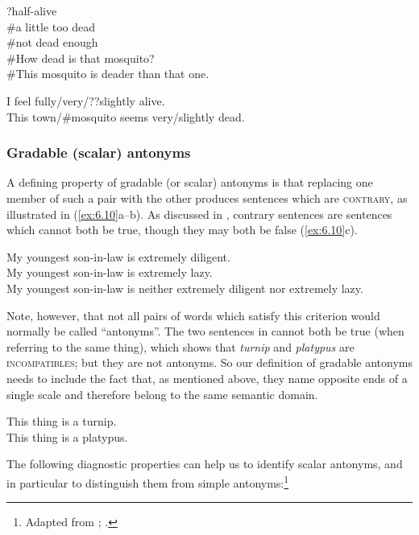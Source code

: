\ea \label{ex:6.8}
\ea ?half-alive\\
\ex \#a little too dead\\
\ex \#not dead enough\\
\ex \#How dead is that mosquito?\\
\ex \#This mosquito is deader than that one.
                       \z
\z

\ea \label{ex:6.9}
\ea I feel fully/very/??slightly alive.\\
\ex This town/\#mosquito seems very/slightly dead.
                       \z
\z

\subsubsection{Gradable (scalar) antonyms}\label{sec:6.2.2.2}

A defining property of gradable (or scalar) antonyms is that replacing one member of such a pair with the other produces sentences which are \textsc{contrary}, as illustrated in (\ref{ex:6.10}a--b). As discussed in , contrary sentences are sentences which cannot both be true, though they may both be false (\ref{ex:6.10}c).


\ea \label{ex:6.10}
\ea My youngest son-in-law is extremely diligent.\\
\ex My youngest son-in-law is extremely lazy.\\
\ex My youngest son-in-law is neither extremely diligent nor extremely lazy.
                       \z
\z


Note, however, that not all pairs of words which satisfy this criterion would normally be called “antonyms”. The two sentences in  cannot both be true (when referring to the same thing), which shows that \textit{turnip} and \textit{platypus} are \textsc{incompatibles}; but they are not antonyms. So our definition of gradable antonyms needs to include the fact that, as mentioned above, they name opposite ends of a single scale and therefore belong to the same semantic domain.


\ea \label{ex:6.11}
\ea This thing is a turnip.\\
\ex This thing is a platypus.
                       \z
\z


The following diagnostic properties can help us to identify scalar antonyms, and in particular to distinguish them from simple antonyms:\footnote{Adapted from \citet[67]{Saeed2009}; \citet[204ff.]{Cruse1986}.}


